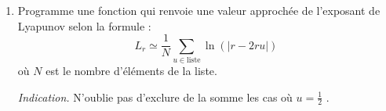 \documentclass[11pt,class=report,crop=false]{standalone}
\begin{document}
\begin{activite}


\begin{center}

\end{center}

\begin{enumerate}
  \item  Programme une fonction 
  qui renvoie une valeur approchée de l'exposant de Lyapunov selon la formule :
$$L_r \simeq \frac{1}{N} \sum_{u \in \text{liste}}  \ln\left(\big| r-2 r u  \big| \right)$$
où $N$ est le nombre d'éléments de la liste.

 \emph{Indication.} N'oublie pas d'exclure de la somme les cas où $u=\frac12$ .
 

\end{enumerate}
\end{activite}
\end{document}
